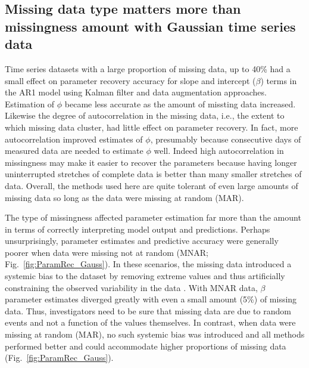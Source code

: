 \documentclass{article}
\begin{document}
\subsection*{Missing data type matters more than missingness amount with Gaussian time series data}        

Time series datasets with a large proportion of missing data, up to 40\% had a small effect on parameter recovery accuracy for slope and intercept ($\beta$) terms in the AR1 model using Kalman filter and data augmentation approaches. Estimation of $\phi$ became less accurate as the amount of missting data increased.  Likewise the degree of autocorrelation in the missing data, i.e., the extent to which missing data cluster, had little effect on parameter recovery. In fact, more autocorrelation improved estimates of $\phi$, presumably because consecutive days of measured data are needed to estimate  $\phi$ well.  Indeed high autocorrelation in missingness may make it easier to recover the parameters because having longer uninterrupted stretches of complete data is better than many smaller stretches of data. Overall, the methods used here are quite tolerant of even large amounts of missing  data so long as the data were missing at random (MAR).


The type of missingness affected parameter estimation far more than the amount in terms of correctly interpreting model output and predictions. Perhaps unsurprisingly, parameter estimates and predictive accuracy were generally poorer when data were missing not at random (MNAR; Fig.~\ref{fig:ParamRec_Gauss}). In these scenarios, the missing data introduced a systemic bias to the dataset by removing extreme values and thus artificially constraining the observed variability in the data \citep{rubin_inference_1976}. With MNAR data, $\beta$ parameter estimates diverged greatly with even a small amount (5\%) of missing data. Thus, investigators need to be sure that missing data are due to random events and not a function of the values themselves.  In contrast, when data were missing at random (MAR), no such systemic bias was introduced and all methods performed better and could accommodate higher proportions of missing data (Fig.~\ref{fig:ParamRec_Gauss}). 
\end{document}
